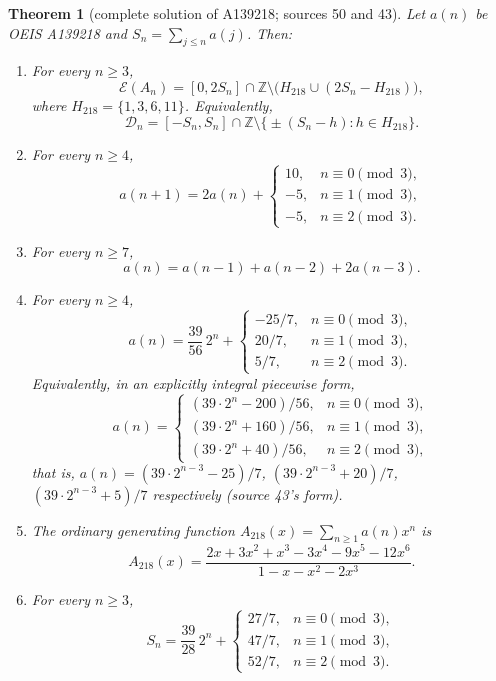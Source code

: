 \documentclass[11pt,a4paper]{article}
\numberwithin{equation}{section}
\newtheorem{theorem}{Theorem}[section]
\theoremstyle{definition}
\theoremstyle{remark}
\theoremstyle{plain}
\newcommand{\Z}{\mathbb Z}
\newcommand{\cD}{\mathcal D}
\newcommand{\cE}{\mathcal E}
\begin{document}
\begin{theorem}[complete solution of A139218; sources 50 and 43]\label{gdf:thm:A139218}
Let $a(n)$ be OEIS A139218 and $S_n=\sum_{j\le n}a(j)$.  Then:
\begin{enumerate}[label=(\alph*)]
\item For every $n\ge3$,
\[
 \cE(A_n)=[0,2S_n]\cap\Z\setminus
 \bigl(H_{218}\cup(2S_n-H_{218})\bigr),
\]
where $H_{218}=\{1,3,6,11\}$.  Equivalently,
\[
 \cD_n=[-S_n,S_n]\cap\Z\setminus
 \bigl\{\pm(S_n-h):h\in H_{218}\bigr\}.
\]
\item For every $n\ge4$,
\begin{equation}\label{gdf:eq:218-first-order}
 a(n+1)=2a(n)+
 \begin{cases}
 10,&n\equiv0\pmod3,\\
 -5,&n\equiv1\pmod3,\\
 -5,&n\equiv2\pmod3.
 \end{cases}
\end{equation}
\item For every $n\ge7$,
\begin{equation}\label{gdf:eq:218-recurrence}
 a(n)=a(n-1)+a(n-2)+2a(n-3).
\end{equation}
\item For every $n\ge4$,
\begin{equation}\label{gdf:eq:218-closed}
 a(n)=\frac{39}{56}\,2^n+
 \begin{cases}
 -25/7,&n\equiv0\pmod3,\\
 20/7,&n\equiv1\pmod3,\\
 5/7,&n\equiv2\pmod3.
 \end{cases}
\end{equation}
Equivalently, in an explicitly integral piecewise form,
\begin{equation}\label{gdf:eq:218-closed-integral}
 a(n)=
 \begin{cases}
 (39\cdot2^n-200)/56,&n\equiv0\pmod3,\\
 (39\cdot2^n+160)/56,&n\equiv1\pmod3,\\
 (39\cdot2^n+40)/56,&n\equiv2\pmod3,
 \end{cases}
\end{equation}
that is, $a(n)=(39\cdot2^{n-3}-25)/7$, $(39\cdot2^{n-3}+20)/7$,
$(39\cdot2^{n-3}+5)/7$ respectively (source 43's form).
\item The ordinary generating function $A_{218}(x)=\sum_{n\ge1}a(n)x^n$ is
\begin{equation}\label{gdf:eq:218-ogf}
 A_{218}(x)=
 \frac{2x+3x^2+x^3-3x^4-9x^5-12x^6}
      {1-x-x^2-2x^3}.
\end{equation}
\item For every $n\ge3$,
\begin{equation}\label{gdf:eq:218-S}
 S_n=\frac{39}{28}\,2^n+
 \begin{cases}
 27/7,&n\equiv0\pmod3,\\
 47/7,&n\equiv1\pmod3,\\
 52/7,&n\equiv2\pmod3.
 \end{cases}
\end{equation}
\end{enumerate}
\end{theorem}
\end{document}
